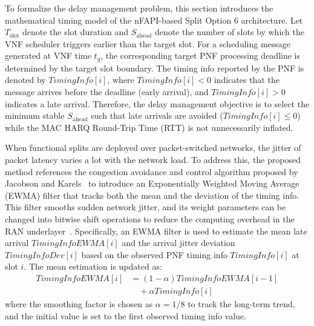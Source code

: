 \documentclass[../my_ntust_thesis.tex]{subfiles}
\begin{document}
To formalize the delay management problem, this section introduces the mathematical timing model of the nFAPI-based Split Option 6 architecture. Let $T_{\mathrm{slot}}$ denote the slot duration and $S_{\mathrm{ahead}}$ denote the number of slots by which the VNF scheduler triggers earlier than the target slot. For a scheduling message generated at VNF time $t_g$, the corresponding target PNF processing deadline is determined by the target slot boundary. The timing info reported by the PNF is denoted by $\mathit{TimingInfo}[i]$, where $\mathit{TimingInfo}[i] < 0$ indicates that the message arrives before the deadline (early arrival), and $\mathit{TimingInfo}[i] > 0$ indicates a late arrival. Therefore, the delay management objective is to select the minimum stable $S_{\mathrm{ahead}}$ such that late arrivals are avoided ($\mathit{TimingInfo}[i] \le 0$) while the MAC HARQ Round-Trip Time (RTT) is not unnecessarily inflated.

When functional splits are deployed over packet-switched networks, the jitter of packet latency varies a lot with the network load. To address this, the proposed method references the congestion avoidance and control algorithm proposed by Jacobson and Karels~\cite{jacobson1988congestion} to introduce an Exponentially Weighted Moving Average (EWMA) filter that tracks both the mean and the deviation of the timing info. This filter smooths sudden network jitter, and its weight parameters can be changed into bitwise shift operations to reduce the computing overhead in the RAN underlayer~\cite{jacobson1988congestion}. Specifically, an EWMA filter is used to estimate the mean late arrival $\mathit{TimingInfoEWMA}[i]$ and the arrival jitter deviation $\mathit{TimingInfoDev}[i]$ based on the observed PNF timing info $\mathit{TimingInfo}[i]$ at slot $i$. The mean estimation is updated as:
\begin{equation}
\begin{split}
\mathit{TimingInfoEWMA}[i] & = (1 - \alpha) \mathit{TimingInfoEWMA}[i-1] \\
& \quad + \alpha \mathit{TimingInfo}[i]
\end{split}
\end{equation}
where the smoothing factor is chosen as $\alpha = 1/8$ to track the long-term trend, and the initial value is set to the first observed timing info value.
\end{document}
